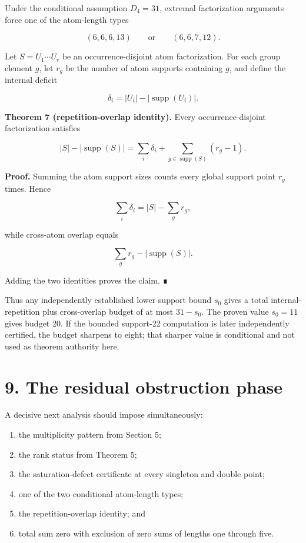 \documentclass[
  11pt,
]{article}
\providecommand{\tightlist}{%
  \setlength{\itemsep}{0pt}\setlength{\parskip}{0pt}}
\begin{document}
Under the conditional assumption \(D_4=31\), extremal factorization
arguments force one of the atom-length types

\[
(6,6,6,13)
\qquad\text{or}\qquad
(6,6,7,12).
\]

Let \(S=U_1\cdots U_r\) be an occurrence-disjoint atom factorization.
For each group element \(g\), let \(r_g\) be the number of atom supports
containing \(g\), and define the internal deficit

\[
\delta_i=|U_i|-|\operatorname{supp}(U_i)|.
\]

\textbf{Theorem 7 (repetition-overlap identity).} Every
occurrence-disjoint factorization satisfies

\[
|S|-|\operatorname{supp}(S)|
=\sum_i\delta_i
+\sum_{g\in\operatorname{supp}(S)}(r_g-1).
\]

\textbf{Proof.} Summing the atom support sizes counts every global
support point \(r_g\) times. Hence

\[
\sum_i\delta_i=|S|-\sum_g r_g,
\]

while cross-atom overlap equals

\[
\sum_g r_g-|\operatorname{supp}(S)|.
\]

Adding the two identities proves the claim. ∎

Thus any independently established lower support bound \(s_0\) gives a
total internal-repetition plus cross-overlap budget of at most
\(31-s_0\). The proven value \(s_0=11\) gives budget 20. If the bounded
support-22 computation is later independently certified, the budget
sharpens to eight; that sharper value is conditional and not used as
theorem authority here.

\hypertarget{the-residual-obstruction-phase}{%
\section{9. The residual obstruction
phase}\label{the-residual-obstruction-phase}}

A decisive next analysis should impose simultaneously:

\begin{enumerate}
\def\labelenumi{\arabic{enumi}.}
\tightlist
\item
  the multiplicity pattern from Section 5;
\item
  the rank status from Theorem 5;
\item
  the saturation-defect certificate at every singleton and double point;
\item
  one of the two conditional atom-length types;
\item
  the repetition-overlap identity; and
\item
  total sum zero with exclusion of zero sums of lengths one through
  five.
\end{enumerate}
\end{document}
